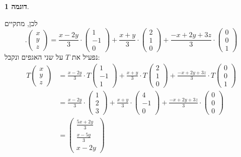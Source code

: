 \documentclass[12pt]{report}
\theoremstyle{plain}
\theoremstyle{definition}
\newtheorem{example}{דוגמה}[chapter]
\newcommand{\0}{\mathbf{0}}
\begin{document}
\begin{example}
\begin{enumerate}[label=\alph*.]
לכן, מתקיים
$$
.\begin{pmatrix}x\\y\\z\end{pmatrix}=\frac{x-2y}{3}\cdot\begin{pmatrix}1\\-1\\0\end{pmatrix}+\frac{x+y}{3}\cdot\begin{pmatrix}2\\1\\0\end{pmatrix}+\frac{-x+2y+3z}{3}\cdot\begin{pmatrix}0\\0\\1\end{pmatrix}
$$
נפעיל את
$T$
על שני האגפים ונקבל:
$$
\begin{aligned}
T\begin{pmatrix}x\\y\\z\end{pmatrix}&=\frac{x-2y}{3}\cdot T\begin{pmatrix}1\\-1\\1\end{pmatrix}+\frac{x+y}{3}\cdot T\begin{pmatrix}2\\1\\0\end{pmatrix}+\frac{-x+2y+3z}{3}\cdot T\begin{pmatrix}0\\0\\1\end{pmatrix} \\
&=\frac{x-2y}{3}\cdot \begin{pmatrix}1\\2\\3\end{pmatrix}+\frac{x+y}{3}\cdot \begin{pmatrix}4\\-1\\0\end{pmatrix}+\frac{-x+2y+3z}{3}\cdot\begin{pmatrix}0\\0\\0\end{pmatrix}\\
&=\begin{pmatrix}\frac{5x+2y}{3}\\\frac{x-5y}{3}\\x-2y\end{pmatrix}

\end{aligned}$$
\end{enumerate}
\end{example}
\end{document}
